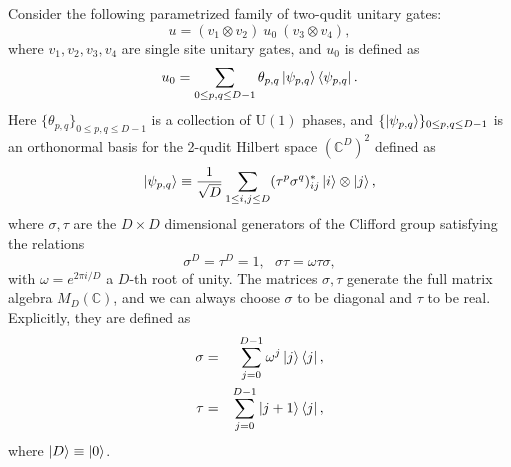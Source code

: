 \documentclass[aps,prx,twocolumn,notitlepage,nofootinbib,nobalancelastpage]{revtex4-2}
\theoremstyle{break}
\newcommand{\1}{\mathbbm{1}}
\theoremstyle{plain}
\theoremstyle{plain}
\theoremstyle{plain}
\begin{document}
Consider the following parametrized family of two-qudit unitary gates:
\begin{equation}
u=(v_{1}\otimes v_{2}) \ u_0 \ (v_{3}\otimes v_{4}),
\label{eq:2quditUgeneralform}
\end{equation}
where $v_{1},v_{2},v_{3},v_{4}$ are single site unitary gates, and $u_0$ is defined as
\begin{equation}
u_0=\sum_{0\leq p,q\leq D-1} \theta_{p,q}\ket{\psi_{p,q}}\bra{\psi_{p,q}}.
\label{eq:CliffordParametrization}
\end{equation}
Here $\{\theta_{p,q}\}_{0\leq p,q\leq D-1}$ is a collection of $\mathrm{U}(1)$ phases, and $\{\ket{\psi_{p,q}}\}_{0\leq p,q\leq D-1}$ is an orthonormal basis for the 2-qudit Hilbert space $(\mathbb{C}^D)^2$ defined as
\begin{equation}
\ket{\psi_{p,q}}\equiv \frac{1}{\sqrt{D}}\sum_{1\leq i,j\leq D}(\tau^p\sigma^q)^*_{ij}\ket{i}\otimes\ket{j},
\label{eq:psi_pq}
\end{equation}
where $\sigma,\tau$ are the $D\times D$ dimensional generators of the Clifford group satisfying the relations
\begin{equation}\label{eq:ZnCliffordCR}
    \sigma^D=\tau^D=1,~~~ \sigma\tau=\omega\tau\sigma,
\end{equation}
with $\omega=e^{2\pi i/D}$ a $D$-th root of unity. The matrices $\sigma,\tau$ generate the full matrix algebra $M_D(\mathbb{C})$, and we can always choose $\sigma$ to be diagonal and $\tau$ to be real. Explicitly, they are defined as 
\begin{eqnarray}\label{eq:def_sigmatau}
    \sigma&=&\sum^{D-1}_{j=0}\omega^{j}\ket{j}\bra{j},\nonumber\\
    \tau&=&\sum^{D-1}_{j=0}\ket{j+1}\bra{j},\label{eq:definition_of_Clifford}
\end{eqnarray}
where $\ket{D}\equiv \ket{0}$.
\end{document}
